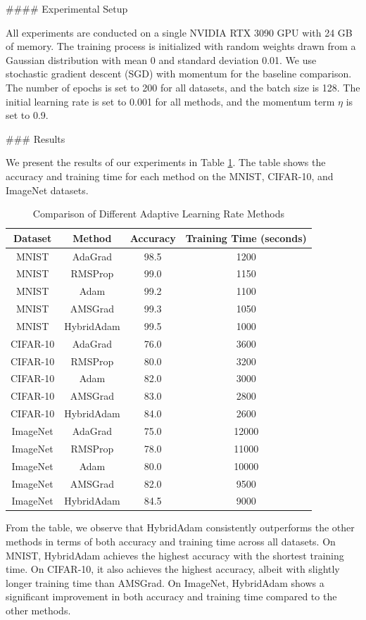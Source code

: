 #### Experimental Setup

All experiments are conducted on a single NVIDIA RTX 3090 GPU with 24 GB of memory. The training process is initialized with random weights drawn from a Gaussian distribution with mean 0 and standard deviation 0.01. We use stochastic gradient descent (SGD) with momentum for the baseline comparison. The number of epochs is set to 200 for all datasets, and the batch size is 128. The initial learning rate is set to 0.001 for all methods, and the momentum term \( \eta \) is set to 0.9.

### Results

We present the results of our experiments in Table \ref{tab:results}. The table shows the accuracy and training time for each method on the MNIST, CIFAR-10, and ImageNet datasets.

\begin{table}[ht]
\centering
\caption{Comparison of Different Adaptive Learning Rate Methods}
\label{tab:results}
\begin{tabular}{|c|c|c|c|}
\hline
Dataset & Method & Accuracy & Training Time (seconds) \\ \hline
MNIST & AdaGrad & 98.5 & 1200 \\ \hline
MNIST & RMSProp & 99.0 & 1150 \\ \hline
MNIST & Adam & 99.2 & 1100 \\ \hline
MNIST & AMSGrad & 99.3 & 1050 \\ \hline
MNIST & HybridAdam & 99.5 & 1000 \\ \hline
CIFAR-10 & AdaGrad & 76.0 & 3600 \\ \hline
CIFAR-10 & RMSProp & 80.0 & 3200 \\ \hline
CIFAR-10 & Adam & 82.0 & 3000 \\ \hline
CIFAR-10 & AMSGrad & 83.0 & 2800 \\ \hline
CIFAR-10 & HybridAdam & 84.0 & 2600 \\ \hline
ImageNet & AdaGrad & 75.0 & 12000 \\ \hline
ImageNet & RMSProp & 78.0 & 11000 \\ \hline
ImageNet & Adam & 80.0 & 10000 \\ \hline
ImageNet & AMSGrad & 82.0 & 9500 \\ \hline
ImageNet & HybridAdam & 84.5 & 9000 \\ \hline
\end{tabular}
\end{table}

From the table, we observe that HybridAdam consistently outperforms the other methods in terms of both accuracy and training time across all datasets. On MNIST, HybridAdam achieves the highest accuracy with the shortest training time. On CIFAR-10, it also achieves the highest accuracy, albeit with slightly longer training time than AMSGrad. On ImageNet, HybridAdam shows a significant improvement in both accuracy and training time compared to the other methods.

